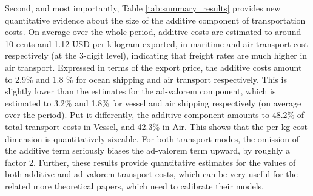 \documentclass[a4paper,11pt]{article}
\begin{document}
Second, and most importantly, Table \ref{tab:summary_results} provides new quantitative evidence about the size of the additive component of transportation costs. On average over the whole period, additive costs are estimated to around 10 cents and 1.12 USD per kilogram exported, in maritime and air transport cost respectively (at the 3-digit level), indicating that freight rates are much higher in air transport. Expressed in terms of the export price, the additive costs amount to 2.9\% and 1.8 \% for ocean shipping and air transport respectively. This is slightly lower than the estimates for the ad-valorem component, which is estimated to 3.2\% and 1.8\% for vessel and air shipping respectively (on average over the period). Put it differently, the additive component amounts to 48.2\% of total transport costs in Vessel, and 42.3\% in Air. This shows that the per-kg cost dimension is quantitatively sizeable. For both transport modes, the omission of the additive term seriously biases the ad-valorem term upward, by roughly a factor 2. Further, these results provide quantitative estimates for the values of both additive and ad-valorem transport costs, which can be very useful for the related more theoretical papers, which need to calibrate their models.\smallskip
\end{document}
